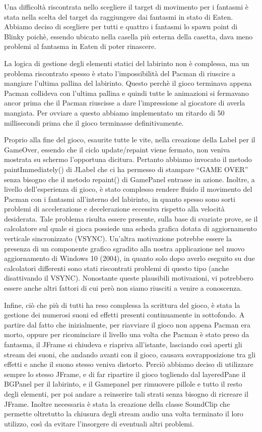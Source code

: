 \documentclass[12pt,a4paper]{report}
\begin{document}
Una difficoltà riscontrata nello scegliere il target di movimento per i fantasmi è stata nella scelta del target da raggiungere dai fantasmi in stato di Eaten. Abbiamo deciso di scegliere per tutti e quattro i fantasmi lo spawn point di Blinky poichè, essendo ubicato nella casella più esterna della casetta, dava meno problemi al fantasma in Eaten di poter rinascere.

La logica di gestione degli elementi statici del labirinto non è complessa, ma un problema riscontrato spesso è stato l’impossibilità del Pacman di riuscire a mangiare l’ultima pallina del labirinto. Questo perchè il gioco terminava appena Pacman collideva con l’ultima pallina e quindi tutte le animazioni si fermavano ancor prima che il Pacman riuscisse a dare l’impressione al giocatore di averla mangiata. Per ovviare a questo abbiamo implementato un ritardo di 50 millisecondi prima che il gioco terminasse definitivamente.

Proprio alla fine del gioco, esaurite tutte le vite, nella creazione della Label per il GameOver, essendo che il ciclo update/repaint viene fermato, non veniva mostrata su schermo l’opportuna dicitura. Pertanto abbiamo invocato il metodo paintImmediately() di JLabel che ci ha permesso di stampare “GAME OVER” senza bisogno che il metodo repaint() di GamePanel entrasse in azione.
Inoltre, a livello dell’esperienza di gioco, è stato complesso rendere fluido il movimento del Pacman con i fantasmi all’interno del labirinto, in quanto spesso sono sorti problemi di accelerazione e decelerazione eccessiva rispetto alla velocità desiderata. Tale problema risulta essere presente, sulla base di svariate prove, se il calcolatore sul quale si gioca possiede una scheda grafica dotata di aggiornamento verticale sincronizzato (VSYNC). Un’altra motivazione potrebbe essere la presenza di un componente grafico sgradito alla nostra applicazione nel nuovo aggiornamento di Windows 10 (2004), in quanto solo dopo averlo eseguito su due calcolatori differenti sono stati riscontrati problemi di questo tipo (anche disattivando il VSYNC). Nonostante queste plausibili motivazioni, vi potrebbero essere anche altri fattori di cui però non siamo riusciti a venire a conoscenza.

Infine, ciò che più di tutti ha reso complessa la scrittura del gioco, è stata la gestione dei numerosi suoni ed effetti presenti continuamente in sottofondo. 
A partire dal fatto che inizialmente, per riavviare il gioco non appena Pacman era morto, oppure per ricominciare il livello una volta che Pacman è stato preso da fantasma, il JFrame si chiudeva e riapriva all’istante, lasciando così aperti gli stream dei suoni, che andando avanti con il gioco, causava sovrapposizione tra gli effetti e anche il suono stesso veniva distorto. Perciò abbiamo deciso di utilizzare sempre lo stesso JFrame, e di far ripartire il gioco togliendo dal layeredPane il BGPanel per il labirinto, e il Gamepanel per rimuovere pillole e tutto il resto degli elementi, per poi andare a reinserire tali strati senza bisogno di ricreare il JFrame. Inoltre necessaria è stata la creazione della classe SoundClip che permette oltretutto la chiusura degli stream audio una volta terminato il loro utilizzo, così da evitare l’insorgere di eventuali altri problemi.
\end{document}
